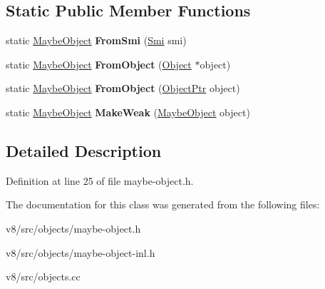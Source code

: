 \subsection*{Static Public Member Functions}
\begin{DoxyCompactItemize}
\item 
\mbox{\label{classv8_1_1internal_1_1MaybeObject_a8c80a3c3221cb2966e1981f751eda3a8}} 
static \mbox{\hyperlink{classv8_1_1internal_1_1MaybeObject}{Maybe\+Object}} {\bfseries From\+Smi} (\mbox{\hyperlink{classv8_1_1internal_1_1Smi}{Smi}} smi)
\item 
\mbox{\label{classv8_1_1internal_1_1MaybeObject_aebc9106731bc9361a422bcfbb3d0a5dc}} 
static \mbox{\hyperlink{classv8_1_1internal_1_1MaybeObject}{Maybe\+Object}} {\bfseries From\+Object} (\mbox{\hyperlink{classv8_1_1internal_1_1Object}{Object}} $\ast$object)
\item 
\mbox{\label{classv8_1_1internal_1_1MaybeObject_a3a685658cfa661155d00e1d7857cf3bd}} 
static \mbox{\hyperlink{classv8_1_1internal_1_1MaybeObject}{Maybe\+Object}} {\bfseries From\+Object} (\mbox{\hyperlink{classv8_1_1internal_1_1ObjectPtr}{Object\+Ptr}} object)
\item 
\mbox{\label{classv8_1_1internal_1_1MaybeObject_a0699febacdc0ac18540874ccc8927151}} 
static \mbox{\hyperlink{classv8_1_1internal_1_1MaybeObject}{Maybe\+Object}} {\bfseries Make\+Weak} (\mbox{\hyperlink{classv8_1_1internal_1_1MaybeObject}{Maybe\+Object}} object)
\end{DoxyCompactItemize}


\subsection{Detailed Description}


Definition at line 25 of file maybe-\/object.\+h.



The documentation for this class was generated from the following files\+:\begin{DoxyCompactItemize}
\item 
v8/src/objects/maybe-\/object.\+h\item 
v8/src/objects/maybe-\/object-\/inl.\+h\item 
v8/src/objects.\+cc\end{DoxyCompactItemize}
